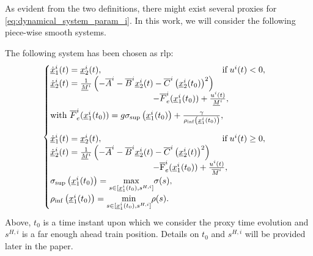 \documentclass[letterpaper, 10 pt, conference]{ieeeconf}
\theoremstyle{definition}
\theoremstyle{nopoint}
\begin{document}
As evident from the two definitions, there might exist several proxies for  \eqref{eq:dynamical_system_param_i}. In this work, we will consider the following piece-wise smooth systems.


The following system has been chosen as \gls{rlp}:
\begin{equation}\label{eq:rlp_train}
\begin{cases}
\underline{\dot{x}}_1^i(t) =   \underline{x}_2^i(t), \qquad  \qquad \qquad \qquad \qquad \qquad  \qquad  \text{if} \; u^i(t) < 0,  \\
    \underline{\dot{x}}_2^i(t) =  \frac{1}{\underline{M}^i} \left(-\overline{A}^i - \overline{B}^i \underline{x}^i_2(t) -  \overline{C}^i \left(\underline{x}^i_2(t_0)\right)^2 \right) \\ 
    \qquad \qquad \qquad  \qquad \qquad \qquad  -\overline{F}_e^i(\underline{x}^i_1(t_0)) + \frac{u^i(t)}{\underline{M}^i}, \\ \noalign{\vskip3pt}
     \textrm{with } \overline{F}_e^i(\underline{x}^i_1(t_0)) =  g \sigma_{\sup}\left(\underline{x}^i_1(t_0)\right)+ \frac{\gamma}{\rho_{\inf}\left(\underline{x}^i_1(t_0)\right)}, \\
    \noalign{\vskip9pt}
        \underline{\dot{x}}_1^i(t) =   \underline{x}_2^i(t), \qquad \qquad \qquad  \qquad \qquad \qquad \qquad \text{if} \; u^i(t) \geq 0,  \\
    \underline{\dot{x}}_2^i(t) =  \frac{1}{\underline{M}^i} \left(-\overline{A}^i - \overline{B}^i \underline{x}^i_2(t) -  \overline{C}^i \left(\underline{x}^i_2(t)\right)^2 \right) \\ 
    \qquad \qquad \qquad  \qquad \qquad \qquad-\overline{\mathrm{F}}_e^i(\underline{x}^i_1(t_0))  + \frac{u^i(t)}{\overline{M}^i}, \\
    \sigma_{\sup}\left(\underline{x}^i_1(t_0)\right) = \underset{s \in [\underline{x}_1^i(t_0),s^{H,i}]}{\max} \sigma(s), \\
    \rho_{\inf}\left(\underline{x}^i_1(t_0)\right) = \underset{s \in [\underline{x}_1^i(t_0),s^{H,i}]}{\min} \rho(s).
\end{cases}
\end{equation}
Above, $t_0$ is a time instant upon which we consider the proxy time evolution and $s^{H,i}$ is a far enough ahead train  position. Details on $t_0$ and $s^{H,i}$ will be provided later in the paper. 
\end{document}
